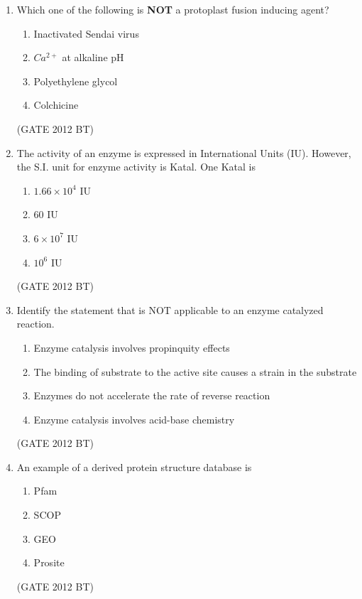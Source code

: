 \documentclass[journal,12pt,onecolumn]{IEEEtran}
\theoremstyle{remark}
\begin{document}
\begin{enumerate}
\item 	Which one of the following is \textbf{NOT} a protoplast fusion inducing agent?
\begin{multicols}{2}
\begin{enumerate}
\item	Inactivated Sendai virus	
\item  $Ca^{2+}$ at alkaline pH
\item  Polyethylene glycol
\item  Colchicine
\end{enumerate}
\end{multicols} \hfill(GATE 2012 BT)


\item The activity of an enzyme is expressed in International Units (IU). However, the S.I. unit for enzyme activity is Katal. One Katal is
\begin{multicols}{4}
\begin{enumerate}
\item $1.66 × 10^{4}$ IU	
\item  $60$ IU	
\item  $6 × 10^7$ IU	
\item  $10^{6}$ IU
\end{enumerate}
\end{multicols} \hfill(GATE 2012 BT)


\item 	Identify the statement that is NOT applicable to an enzyme catalyzed reaction.
\begin{enumerate}
\item	Enzyme catalysis involves propinquity effects
\item 	The binding of substrate to the active site causes a strain in the substrate
\item 	Enzymes do not accelerate the rate of reverse reaction
\item 	Enzyme catalysis involves acid-base chemistry
\end{enumerate}  \hfill(GATE 2012 BT)

\item An example of a derived protein structure database is
\begin{multicols}{4}
\begin{enumerate}
\item Pfam
\item SCOP	
\item GEO	
\item Prosite
\end{enumerate}
\end{multicols} \hfill(GATE 2012 BT)



\end{enumerate}
\end{document}
